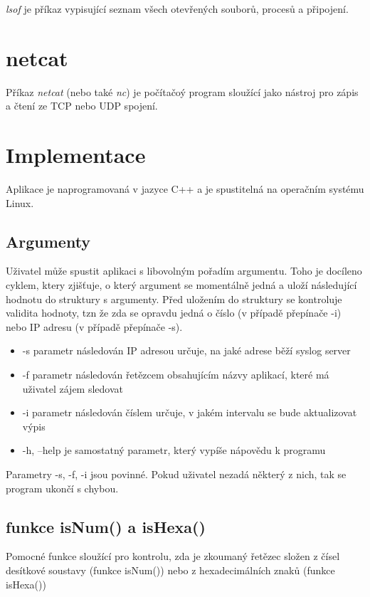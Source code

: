\documentclass[a4paper]{article}
\begin{document}
	\emph{lsof} je příkaz vypisující seznam všech otevřených souborů, procesů a připojení.

	\section{netcat}

	Příkaz \emph{netcat} (nebo také \emph{nc}) je počítačoý program sloužící jako nástroj pro zápis a čtení ze TCP nebo UDP spojení.

	\section{Implementace}

	Aplikace je naprogramovaná v jazyce C++ a je spustitelná na operačním systému Linux.

	\subsection{Argumenty}

	Uživatel může spustit aplikaci s libovolným pořadím argumentu. Toho je docíleno cyklem, ktery zjišťuje, o který argument se momentálně jedná a uloží následující hodnotu do struktury s argumenty. Před uložením do struktury se kontroluje validita hodnoty, tzn že zda se opravdu jedná o číslo (v případě přepínače -i) nebo IP adresu (v případě přepínače -s).
	\begin{itemize}
		\item -s parametr následován IP adresou určuje, na jaké adrese běží syslog server
		\item -f parametr následován řetězcem obsahujícím názvy aplikací, které má uživatel zájem sledovat
		\item -i parametr následován číslem určuje, v jakém intervalu se bude aktualizovat výpis
		\item -h, --help je samostatný parametr, který vypíše nápovědu k programu
	\end{itemize}
	Parametry -s, -f, -i jsou povinné. Pokud uživatel nezadá některý z nich, tak se program ukončí s chybou.

	\subsection{funkce isNum() a isHexa()}

	Pomocné funkce sloužící pro kontrolu, zda je zkoumaný řetězec složen z čísel desítkové soustavy (funkce isNum()) nebo z hexadecimálních znaků (funkce isHexa())
\end{document}
